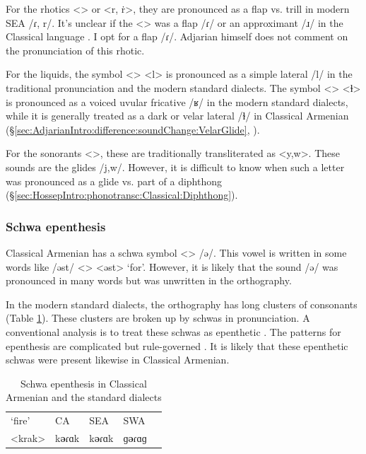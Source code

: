 For the rhotics <> or <r, ṙ>, they are pronounced as a flap vs. trill in   modern SEA /ɾ, r/. It's unclear if the <> was a flap /ɾ/ or an approximant /ɹ/ in the Classical language \citep[1040]{Macak-2017-PhonoClassicalArmenian}. I opt for a flap /ɾ/. Adjarian himself does not comment on the pronunciation of this rhotic. 


For the liquids, the symbol <> <l> is pronounced as a simple lateral /l/ in the traditional pronunciation and the modern standard dialects. The symbol <> <ɫ> is pronounced as a voiced uvular fricative /ʁ/ in the modern standard dialects, while it is generally treated as a dark or velar lateral /ɫ/ in Classical Armenian (\S\ref{sec:AdjarianIntro:difference:soundChange:VelarGlide}, \citealt[ch2]{Macak-2016-StudiesClassicalModernArmenianPhono}).

For the sonorants <>, these are traditionally transliterated as <y,w>. These sounds are the glides /j,w/. However, it is difficult to know when such a letter was pronounced as a glide vs. part of a diphthong (\S\ref{sec:HossepIntro:phonotransc:Classical:Diphthong}). 

\subsubsection{Schwa epenthesis}\label{sec:HossepIntro:phonotransc:CA:schwa}


Classical Armenian has a schwa symbol <> /ə/. This vowel is written in some words like /əst/ <> <əst> `for'. However, it is likely that the sound /ə/ was pronounced in many words but was unwritten in the orthography. 

In the modern standard dialects, the orthography has long clusters of consonants (Table \ref{tab:HossepIntro:schwaEpen}). These clusters are broken up by schwas in pronunciation. A conventional analysis is to treat these schwas as epenthetic \citep{Vaux-1998-ArmenianPhono}. The patterns for epenthesis are complicated but rule-governed \citep[cf.][]{Dolatian-prep-Schwa}. It is likely that these epenthetic schwas were present likewise in Classical Armenian. 



\begin{table}[H]
	\caption{Schwa epenthesis in Classical Armenian and the standard dialects} \label{tab:HossepIntro:schwaEpen}
	\centering 
	\begin{tabular}{|l| lll| l| }
		\hline `fire'	& CA & SEA & SWA & \\
		<krak> & k\textbf{ə}ɾɑk &k\textbf{ə}ɾɑk &ɡ\textbf{ə}ɾɑɡ & \armenian{կրակ}
		\\\hline 
	\end{tabular}
\end{table}

